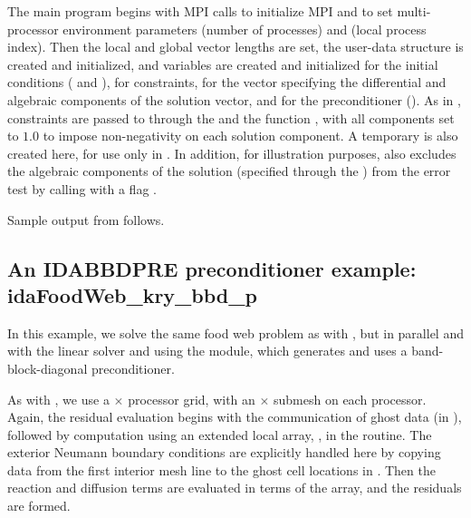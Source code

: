 The  main program begins with MPI calls to initialize MPI and to
set multi-processor environment parameters  (number of processes) and
 (local process index).  Then the local and global vector lengths are set,
the user-data structure  is created and initialized, and 
variables are created and initialized for the initial conditions ( and
), for constraints, for the vector  specifying the differential 
and algebraic components of the solution vector, and for the preconditioner
().  As in , constraints are passed to {\ida} through the
  and the function , with
all components set to $1.0$ to impose non-negativity on each solution component.
A temporary   is also created here, for use only in
.  In addition, for illustration purposes,
 also excludes the algebraic components of the solution
(specified through the  ) from the error test by calling
 with a flag .

Sample output from  follows.


\subsection{An IDABBDPRE preconditioner example: idaFoodWeb\_kry\_bbd\_p}\label{ss:idaFoodWeb_bbd_p}

In this example, we solve the same food web problem as with
, but in parallel and with the {\sunlinsolspgmr} linear solver and
using the {\idabbdpre} module, which generates and uses a band-block-diagonal 
preconditioner.

As with , we use a  $\times$  processor grid, with
an  $\times$  submesh on each processor.  Again, the residual
evaluation begins with the communication of ghost data (in ),
followed by computation using an extended local array, , in the
 routine.
The exterior Neumann boundary conditions are explicitly handled here
by copying data from the first interior mesh line to the ghost cell
locations in .  Then the reaction and diffusion terms are
evaluated in terms of the  array, and the residuals are formed.

